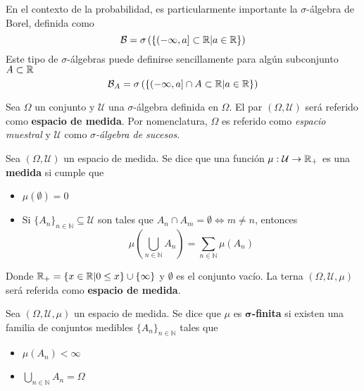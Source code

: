 En el contexto de la probabilidad, es particularmente importante la $\sigma$-álgebra de Borel, definida como
\begin{equation}
\mathcal{B} = \sigma\left( \left\{ \left( -\infty , a \right] \subset \mathbb{R} \lvert a\in \mathbb{R} \right\} \right)
\end{equation}
Este tipo de $\sigma$-álgebras puede definirse sencillamente para algún subconjunto $A \subset \mathbb{R}$
\begin{equation}
\mathcal{B}_A = \sigma\left( \left\{ \left( -\infty , a \right] \cap A \subset \mathbb{R} \lvert a\in \mathbb{R} \right\} \right)
\end{equation}

\begin{definicion}
Sea $\Omega$ un conjunto y $\mathcal{U}$ una $\sigma$-álgebra definida en $\Omega$. El par $(\Omega,\mathcal{U})$ será referido como \textbf{espacio de medida}. Por nomenclatura, $\Omega$ es referido como \textit{espacio muestral} y $\mathcal{U}$ como \textit{$\sigma$-álgebra de sucesos}.
\end{definicion}

\begin{definicion}%
Sea $(\Omega, \mathcal{U})$ un espacio de medida. Se dice que una función $\mu : \mathcal{U} \rightarrow \mathbb{R}_+$ es una \textbf{medida} si cumple que
\begin{itemize}
\item $\mu(\emptyset) = 0$
\item Si $\{ A_n \}_{n\in \mathbb{N}} \subseteq \mathcal{U}$ son tales que 
$A_n \cap A_m = \emptyset \Leftrightarrow m\neq n$, entonces
$$ \mu\left( \bigcup_{n\in \mathbb{N}} A_n \right) = \sum_{n\in \mathbb{N}} \mu(A_n)$$
\end{itemize}
Donde $\mathbb{R}_+ = \{ x\in \mathbb{R} | 0 \leq x \} \cup \{ \infty \}$ y $\emptyset$ es el conjunto vacío.
La terna $(\Omega,\mathcal{U},\mu)$ será referida como \textbf{espacio de medida}.
\label{medida}
\end{definicion}

\begin{definicion}%
Sea $(\Omega,\mathcal{U},\mu)$ un espacio de medida. Se dice que $\mu$ es 
\textbf{$\boldsymbol{\sigma}$-finita} si existen una familia de conjuntos medibles $\{ A_n \}_{n\in \mathbb{N}}$ tales que
\begin{itemize}
\item $\mu\left( A_n \right) < \infty$
\item $ \bigcup_{n\in \mathbb{N}} A_n = \Omega$
\end{itemize}
\end{definicion}

